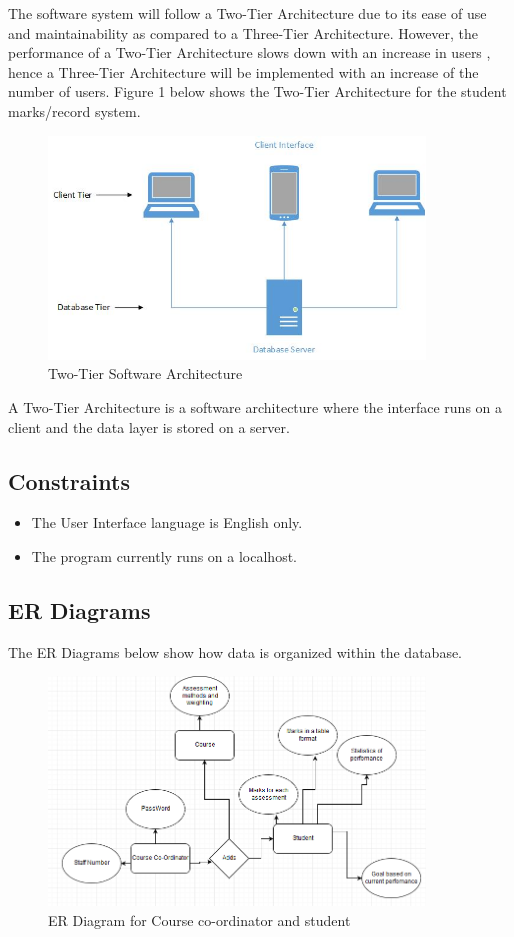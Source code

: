 \documentclass[10pt,onecolumn]{MainDocument}
\begin{document}
The software system will follow a Two-Tier Architecture due to its ease of use and maintainability as compared to a Three-Tier Architecture. However, the performance of a Two-Tier Architecture slows down with an increase in users \cite{ref3}, hence a Three-Tier Architecture will be implemented with an increase of the number of users. Figure 1 below shows the Two-Tier Architecture for the student marks/record system.   
\begin{center}
\begin{figure}[h]
\centering
\includegraphics[width=10cm]{Two-Tier}
\caption{Two-Tier Software Architecture}
\end{figure}
\end{center}

A Two-Tier Architecture is a software architecture where the interface runs on a client and the data layer is stored on a server\cite{ref4}.



\subsection{Constraints }
\begin{itemize}
\item The User Interface language is English only.
\item The program currently runs on a localhost.
\end{itemize}

\subsection{ER Diagrams }
The ER Diagrams below show how data is organized within the database.

\begin{center}
\begin{figure}[h]
\centering
\includegraphics[width=10cm]{ER1}
\caption{ER Diagram for Course co-ordinator and student}
\end{figure}
\end{center}
\end{document}
